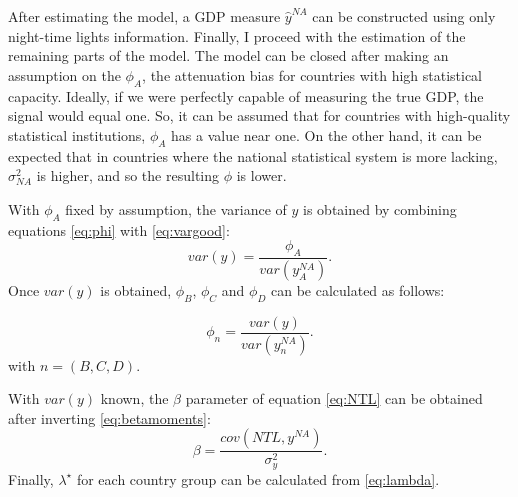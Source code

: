  

 After estimating the model, a GDP measure $\hat{y}^{NA}$ can be constructed using only night-time lights information.
 Finally, I proceed with the estimation of the remaining parts of the model.
 The model can be closed after making an assumption on the $\phi_A$, the attenuation bias for countries with high statistical capacity. Ideally, if we were perfectly capable of measuring the true GDP, the signal would equal one. So, it can be assumed that for countries with high-quality statistical institutions, $\phi_A$ has a value near one. On the other hand, it can be expected that in countries where the national statistical system is more lacking, $\sigma^2_{NA}$ is higher, and so the resulting $\phi$ is lower. 
 
 With $\phi_A$ fixed by assumption, the variance of $y$ is obtained by combining equations \ref{eq:phi} with \ref{eq:vargood}:
 \begin{equation}
     var(y)=\frac{\phi_A}{var(y^{NA}_A)}.
 \end{equation}
 Once $var(y)$ is obtained, $\phi_B$, $\phi_C$ and $\phi_D$ can be calculated as follows:
 
  \begin{equation}
    \phi_n =\frac{var(y)}{var(y^{NA}_n)}.
 \end{equation}
with $n=(B,C,D)$.

With $var(y)$ known, the $\beta$ parameter of equation \ref{eq:NTL} can be obtained after inverting \ref{eq:betamoments}:
\begin{equation}
    \beta  = \frac{cov(NTL,y^{NA})}{\sigma^2_y} .
\end{equation}
Finally, $\lambda^{\star}$ for each country group can be calculated from \ref{eq:lambda}.


